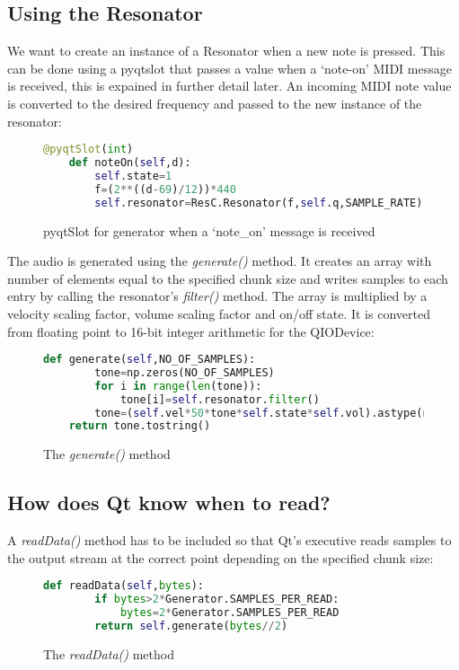 \documentclass{article}
\begin{document}
\subsection{Using the Resonator}
We want to create an instance of a Resonator when a new note is pressed. This can be done using a pyqtslot that passes a value when a `note-on' MIDI message is received, this is expained in further detail later. An incoming MIDI note value is converted to the desired frequency and passed to the new instance of the resonator:
 \begin{figure}[H]
	\begin{lstlisting}[language=python]
	@pyqtSlot(int)
	def noteOn(self,d):	
		self.state=1 
		f=(2**((d-69)/12))*440
		self.resonator=ResC.Resonator(f,self.q,SAMPLE_RATE)
	\end{lstlisting}
	\caption{pyqtSlot for generator when a `note\_on' message is received}
\end{figure}
\pagebreak
The audio is generated using the \textit{generate()} method. It creates an array with number of elements equal to the specified chunk size and writes samples to each entry by calling the resonator's \textit{filter()} method. The array is multiplied by a velocity scaling factor, volume scaling factor and on/off state. It is converted from floating point to 16-bit integer arithmetic for the QIODevice:
 \begin{figure}[H]
	\begin{lstlisting}[language=python]
    def generate(self,NO_OF_SAMPLES):
		tone=np.zeros(NO_OF_SAMPLES)
		for i in range(len(tone)):           
			tone[i]=self.resonator.filter()
		tone=(self.vel*50*tone*self.state*self.vol).astype(np.int16)	
	return tone.tostring()
	\end{lstlisting}
	\caption{The \textit{generate()} method}
\end{figure}
\subsection{How does Qt know when to read?}
A \textit{readData()} method has to be included so that Qt's executive reads samples to the output stream at the correct point depending on the specified chunk size:
 \begin{figure}[H]
	\begin{lstlisting}[language=python]
    def readData(self,bytes):
		if bytes>2*Generator.SAMPLES_PER_READ:
			bytes=2*Generator.SAMPLES_PER_READ
		return self.generate(bytes//2)
	\end{lstlisting}
	\caption{The \textit{readData()} method}
\end{figure}
\end{document}
